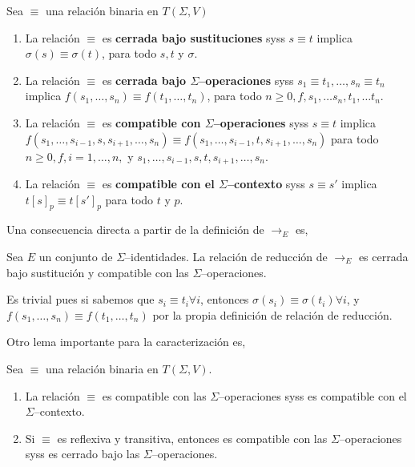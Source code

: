 \begin{defi} 
  Sea $\equiv$ una relación binaria en $T(\Sigma,V)$
  \begin{enumerate}
  \item La relación $\equiv$ es \textbf{cerrada bajo sustituciones} syss $s \equiv t$
    implica $\sigma(s) \equiv \sigma(t)$, para todo $s,t$ y $\sigma$. 
  \item La relación $\equiv$ es \textbf{cerrada bajo $\Sigma$--operaciones} syss $s_1
    \equiv t_1, \dots, s_n \equiv t_n$ implica $f(s_1, \dots, s_n) \equiv
    f(t_1, \dots, t_n)$, para todo $n \geq 0, f, s_1, \dots s_n, t_1, \dots
    t_n.$ 
  \item La relación $\equiv$ es \textbf{compatible con $\Sigma$--operaciones} syss $ s
    \equiv t$ implica \newline $f(s_1, \dots, s_{i-1},s, s_{i+1},\dots, s_n) \equiv
    f(s_1, \dots, s_{i-1},t, s_{i+1},\dots, s_n)$ para todo $n \geq 0, f, i =
    1, \dots, n,$ y $s_1, \dots, s_{i-1},s,t, s_{i+1},\dots, s_n$. 
  \item La relación $\equiv$ es \textbf{compatible con el $\Sigma$--contexto} syss $s
    \equiv s'$ implica $t[s]_p \equiv t[s']_p$ para todo $t$ y $p$. 
  \end{enumerate}       
\end{defi}

Una consecuencia directa a partir de la definición de $\rightarrow_E$ es,

\begin{lema} \label{lema:2.1}
  Sea $E$ un conjunto de $\Sigma$--identidades. La relación de reducción de
  $\rightarrow_E$ es cerrada bajo sustitución y compatible con las
  $\Sigma$--operaciones.
\end{lema}

\begin{demo}
  Es trivial pues si sabemos que $s_i \equiv t_i \forall i$, entonces
  $\sigma(s_i) \equiv \sigma(t_i) \forall i$, y
  $f(s_1, \dots, s_n) \equiv f(t_1, \dots, t_n)$ por la propia
  definición de relación de reducción.
\end{demo}

Otro lema importante para la caracterización es,

\begin{lema} \label{lema:2.2}
  Sea $\equiv$ una relación binaria en $T(\Sigma,V)$.
  \begin{enumerate}
  \item La relación $\equiv$ es compatible con las
    $\Sigma$--operaciones syss es compatible con el
    $\Sigma$--contexto.
  \item Si $\equiv$ es reflexiva y transitiva, entonces es compatible
    con las $\Sigma$--operaciones syss es cerrado bajo las
    $\Sigma$--operaciones.
  \end{enumerate}
\end{lema}

